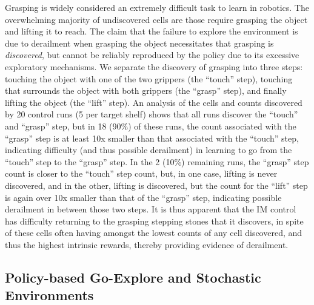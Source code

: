 \documentclass{nature}
\renewcommand*{\cite}[1]{\supercite{#1}}
\begin{document}
Grasping is widely considered an extremely difficult task to learn in robotics\cite{nair2018overcoming,kraft2010development}. The overwhelming majority of undiscovered cells are those require grasping the object and lifting it to reach.
The claim that the failure to explore the environment is due to derailment when grasping the object necessitates that grasping is \emph{discovered}, but cannot be reliably reproduced by the policy due to its excessive exploratory mechanisms. We separate the discovery of grasping into three steps: touching the object with one of the two grippers (the ``touch'' step), touching that surrounds the object with both grippers (the ``grasp'' step), and finally lifting the object (the ``lift'' step). An analysis of the cells and counts discovered by 20 control runs (5 per target shelf) shows that all runs discover the ``touch'' and ``grasp'' step, but in 18 (90\%) of these runs, the count associated with the ``grasp'' step is at least 10x smaller than that associated with the ``touch'' step, indicating difficulty (and thus possible derailment) in learning to go from the ``touch'' step to the ``grasp'' step. In the 2 (10\%) remaining runs, the ``grasp'' step count is closer to the ``touch'' step count, but, in one case, lifting is never discovered, and in the other, lifting is discovered, but the count for the ``lift'' step is again over 10x smaller than that of the ``grasp'' step, indicating possible derailment in between those two steps. It is thus apparent that the IM control has difficulty returning to the grasping stepping stones that it discovers, in spite of these cells often having amongst the lowest counts of any cell discovered, and thus the highest intrinsic rewards, thereby providing evidence of derailment.

\subsection{Policy-based Go-Explore and Stochastic Environments}
\end{document}
